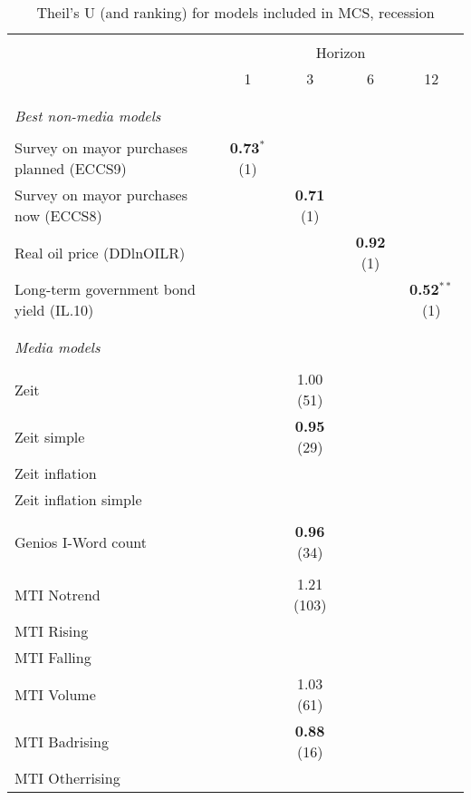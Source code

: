 
\begin{table}[!htbp] \centering 
  \caption{Theil's U (and ranking) for models included in MCS, recession} 
  \label{} 
\scriptsize 
\begin{tabular}{@{\extracolsep{5pt}} lcccc} 
\\[-1.8ex]\hline 
\hline \\[-1.8ex] 
&\multicolumn{4}{c}{Horizon}\\
 & 1 & 3 & 6 & 12 \\ 
\hline \\[-1.8ex] 
\multicolumn{5}{c}{}\\
\textit{Best non-media models} &  &  &  &\\
\multicolumn{5}{c}{}\\
Survey on mayor purchases planned (ECCS9) & \textbf{0.73$^{*}$} (1) &  &  &  \\ 
Survey on mayor purchases now (ECCS8) &  & \textbf{0.71} (1) &  &  \\ 
Real oil price (DDlnOILR) &  &  & \textbf{0.92} (1) &  \\ 
Long-term government bond yield (IL.10) &  &  &  & \textbf{0.52$^{**}$} (1) \\ 
\hline \\[-1.8ex] 
\multicolumn{5}{c}{}\\
\textit{Media models}&  &  &  &\\
\multicolumn{5}{c}{}\\
Zeit &  & 1.00 (51) &  &  \\ 
Zeit simple &  & \textbf{0.95} (29) &  &  \\ 
Zeit inflation &  &  &  &  \\ 
Zeit inflation simple &  &  &  &  \\ 
\multicolumn{5}{c}{}\\
Genios I-Word count &  & \textbf{0.96} (34) &  &  \\ 
\multicolumn{5}{c}{}\\
MTI Notrend &  & 1.21 (103) &  &  \\ 
MTI Rising &  &  &  &  \\ 
MTI Falling &  &  &  &  \\ 
MTI Volume &  & 1.03 (61) &  &  \\ 
MTI Badrising &  & \textbf{0.88} (16) &  &  \\ 
MTI Otherrising &  &  &  &  \\ 

\end{tabular}
\end{table}
